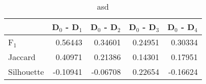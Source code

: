 \begin{table}
\centering
\caption{asd}
\label{tab:s1-cont-total-pivotbi-combined}
\begin{tabular}{lrrrr}
\toprule
{} &  D$_0$ - D$_1$ &  D$_0$ - D$_2$ &  D$_0$ - D$_3$ &  D$_0$ - D$_4$ \\
\midrule
F$_1$      &        0.56443 &        0.34601 &        0.24951 &        0.30334 \\
Jaccard    &        0.40971 &        0.21386 &        0.14301 &        0.17951 \\
Silhouette &       -0.10941 &       -0.06708 &        0.22654 &       -0.16624 \\
\bottomrule
\end{tabular}
\end{table}
